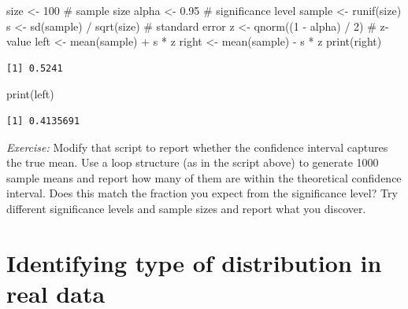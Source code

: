 \documentclass[
  letterpaper,
  DIV=11,
  numbers=noendperiod]{scrreprt}
\newenvironment{Shaded}{\begin{snugshade}}{\end{snugshade}}
\newcommand{\CommentTok}[1]{\textcolor[rgb]{0.37,0.37,0.37}{#1}}
\newcommand{\DecValTok}[1]{\textcolor[rgb]{0.68,0.00,0.00}{#1}}
\newcommand{\FloatTok}[1]{\textcolor[rgb]{0.68,0.00,0.00}{#1}}
\newcommand{\FunctionTok}[1]{\textcolor[rgb]{0.28,0.35,0.67}{#1}}
\newcommand{\NormalTok}[1]{\textcolor[rgb]{0.00,0.23,0.31}{#1}}
\newcommand{\OtherTok}[1]{\textcolor[rgb]{0.00,0.23,0.31}{#1}}
\newcommand{\SpecialCharTok}[1]{\textcolor[rgb]{0.37,0.37,0.37}{#1}}
\begin{document}
\begin{Shaded}
\begin{Highlighting}[]
\NormalTok{size }\OtherTok{\textless{}{-}} \DecValTok{100} \CommentTok{\# sample size}
\NormalTok{alpha }\OtherTok{\textless{}{-}} \FloatTok{0.95} \CommentTok{\# significance level}
\NormalTok{sample }\OtherTok{\textless{}{-}} \FunctionTok{runif}\NormalTok{(size)}
\NormalTok{s }\OtherTok{\textless{}{-}} \FunctionTok{sd}\NormalTok{(sample) }\SpecialCharTok{/} \FunctionTok{sqrt}\NormalTok{(size) }\CommentTok{\# standard error}
\NormalTok{z }\OtherTok{\textless{}{-}} \FunctionTok{qnorm}\NormalTok{((}\DecValTok{1} \SpecialCharTok{{-}}\NormalTok{ alpha) }\SpecialCharTok{/} \DecValTok{2}\NormalTok{) }\CommentTok{\# z{-}value}
\NormalTok{left }\OtherTok{\textless{}{-}} \FunctionTok{mean}\NormalTok{(sample) }\SpecialCharTok{+}\NormalTok{ s }\SpecialCharTok{*}\NormalTok{ z}
\NormalTok{right }\OtherTok{\textless{}{-}} \FunctionTok{mean}\NormalTok{(sample) }\SpecialCharTok{{-}}\NormalTok{ s }\SpecialCharTok{*}\NormalTok{ z}
\FunctionTok{print}\NormalTok{(right)}
\end{Highlighting}
\end{Shaded}

\begin{verbatim}
[1] 0.5241
\end{verbatim}

\begin{Shaded}
\begin{Highlighting}[]
\FunctionTok{print}\NormalTok{(left)}
\end{Highlighting}
\end{Shaded}

\begin{verbatim}
[1] 0.4135691
\end{verbatim}

\emph{Exercise:} Modify that script to report whether the confidence
interval captures the true mean. Use a loop structure (as in the script
above) to generate 1000 sample means and report how many of them are
within the theoretical confidence interval. Does this match the fraction
you expect from the significance level? Try different significance
levels and sample sizes and report what you discover.

\hypertarget{identifying-type-of-distribution-in-real-data}{%
\section{Identifying type of distribution in real
data}\label{identifying-type-of-distribution-in-real-data}}
\end{document}
